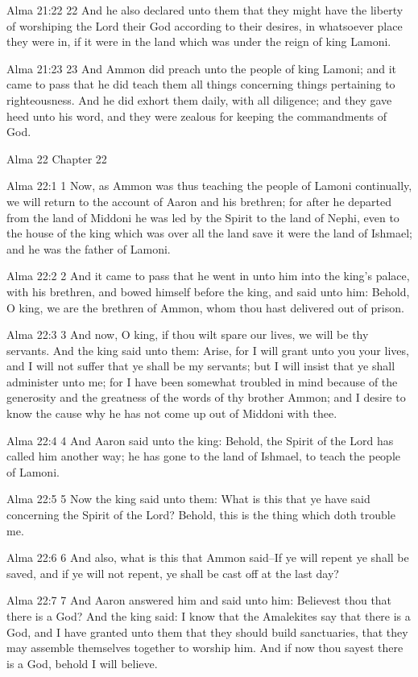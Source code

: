 Alma 21:22
 22 And he also declared unto them that they might have the
liberty of worshiping the Lord their God according to their
desires, in whatsoever place they were in, if it were in the land
which was under the reign of king Lamoni.

Alma 21:23
 23 And Ammon did preach unto the people of king Lamoni; and it
came to pass that he did teach them all things concerning things
pertaining to righteousness. And he did exhort them daily, with
all diligence; and they gave heed unto his word, and they were
zealous for keeping the commandments of God.

Alma 22
Chapter 22

Alma 22:1
 1 Now, as Ammon was thus teaching the people of Lamoni
continually, we will return to the account of Aaron and his
brethren; for after he departed from the land of Middoni he was
led by the Spirit to the land of Nephi, even to the house of the
king which was over all the land save it were the land of
Ishmael; and he was the father of Lamoni.

Alma 22:2
 2 And it came to pass that he went in unto him into the king's
palace, with his brethren, and bowed himself before the king, and
said unto him: Behold, O king, we are the brethren of Ammon, whom
thou hast delivered out of prison.

Alma 22:3
 3 And now, O king, if thou wilt spare our lives, we will be thy
servants. And the king said unto them: Arise, for I will grant
unto you your lives, and I will not suffer that ye shall be my
servants; but I will insist that ye shall administer unto me; for
I have been somewhat troubled in mind because of the generosity
and the greatness of the words of thy brother Ammon; and I desire
to know the cause why he has not come up out of Middoni with
thee.

Alma 22:4
 4 And Aaron said unto the king: Behold, the Spirit of the Lord
has called him another way; he has gone to the land of Ishmael,
to teach the people of Lamoni.

Alma 22:5
 5 Now the king said unto them: What is this that ye have said
concerning the Spirit of the Lord? Behold, this is the thing
which doth trouble me.

Alma 22:6
 6 And also, what is this that Ammon said--If ye will repent ye
shall be saved, and if ye will not repent, ye shall be cast off
at the last day?

Alma 22:7
 7 And Aaron answered him and said unto him: Believest thou that
there is a God? And the king said: I know that the Amalekites
say that there is a God, and I have granted unto them that they
should build sanctuaries, that they may assemble themselves
together to worship him. And if now thou sayest there is a God,
behold I will believe.

